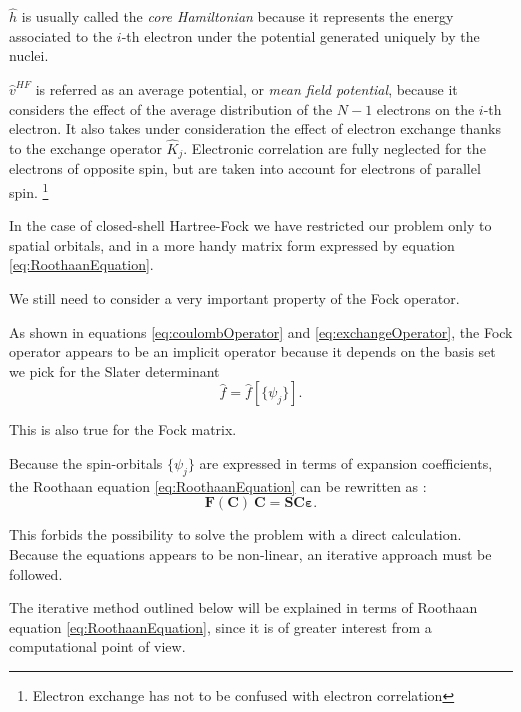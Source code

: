 \documentclass[a4paper,12pt]{article}
\begin{document}
$\hat{h}$ is usually called the \textit{core Hamiltonian} because it represents the energy associated to the $i$-th electron under the potential generated uniquely by the nuclei.

$\hat{v}^{HF}$ is referred as an average potential, or \textit{mean field potential}, because it considers the effect of the average distribution of the $N-1$ electrons on the $i$-th electron. It also takes under consideration the effect of electron exchange thanks to the exchange operator $\hat{K}_j$. Electronic correlation are fully neglected for the electrons of opposite spin, but are taken into account for electrons of parallel spin. \footnote{Electron exchange has not to be confused with electron correlation}

In the case of closed-shell Hartree-Fock we have restricted our problem only to spatial orbitals, and in a more handy matrix form expressed by equation \eqref{eq:RoothaanEquation}.

We still need to consider a very important property of the Fock operator.

As shown in equations \eqref{eq:coulombOperator} and \eqref{eq:exchangeOperator},
the Fock operator appears to be an implicit operator because it depends on the basis set we pick for the Slater determinant
\begin{equation}
\hat{f} = \hat{f}[\{\psi_{j}\}].
\end{equation}

This is also true for the Fock matrix.

Because the spin-orbitals $\{\psi_{j}\}$ are expressed in terms of expansion coefficients, the Roothaan equation \eqref{eq:RoothaanEquation} can be rewritten as :
\begin{equation}
	\mathbf{F(C)~C} = \mathbf{SC\varepsilon}.
\end{equation}


This forbids the possibility to solve the problem with a direct calculation. 
Because the equations appears to be non-linear, an iterative approach must be followed.

The iterative method outlined below will be explained in terms of Roothaan equation \eqref{eq:RoothaanEquation}, since it is  of greater interest from a computational point of view.
\end{document}
